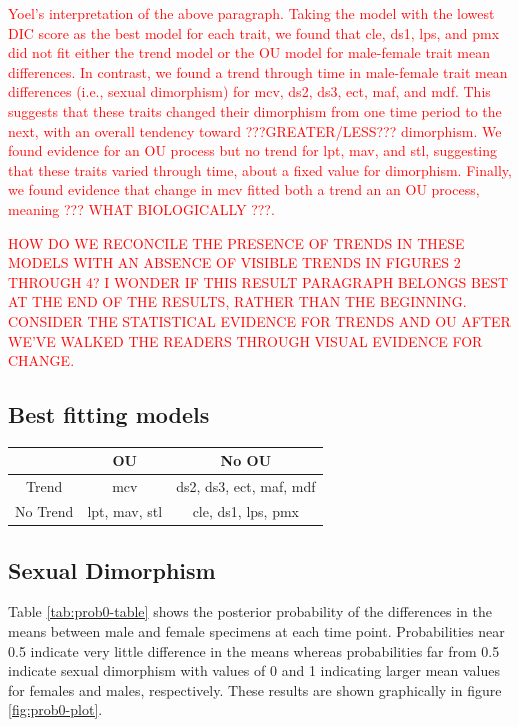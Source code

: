 \documentclass[
  12pt,
]{article}
\begin{document}
\textcolor{red} {
Yoel's interpretation of the above paragraph. Taking the model with the lowest DIC score as the best model for each trait, we found that cle, ds1, lps, and pmx did not fit either the trend model or the OU model for male-female trait mean differences. In contrast, we found a trend through time in male-female trait mean differences (i.e., sexual dimorphism) for mcv, ds2, ds3, ect, maf, and mdf. This suggests that these traits changed their dimorphism from one time period to the next, with an overall tendency toward ???GREATER/LESS??? dimorphism.
} \textcolor{red} {
We found evidence for an OU process but no trend for lpt, mav, and stl, suggesting that these traits varied through time, about a fixed value for dimorphism. Finally, we found evidence that change in mcv fitted both a trend an an OU process, meaning ??? WHAT BIOLOGICALLY ???.
}

\textcolor{red} {HOW DO WE RECONCILE THE PRESENCE OF TRENDS IN THESE MODELS WITH AN ABSENCE OF VISIBLE TRENDS IN FIGURES 2 THROUGH 4? I WONDER IF THIS RESULT PARAGRAPH BELONGS BEST AT THE END OF THE RESULTS, RATHER THAN THE BEGINNING. CONSIDER THE STATISTICAL EVIDENCE FOR TRENDS AND OU AFTER WE'VE WALKED THE READERS THROUGH VISUAL EVIDENCE FOR CHANGE.
}

\hypertarget{best-fitting-models}{%
\subsection{Best fitting models}\label{best-fitting-models}}

\begin{table}[ht]
\centering
\begin{tabular}{|c||c|c|}
  \hline
 & OU & No OU  \\ 
  \hline
  \hline
Trend  &  mcv  & ds2, ds3, ect, maf, mdf \\ 
  \hline
  No Trend & lpt, mav, stl  &  cle, ds1, lps, pmx\\
   \hline
\end{tabular}
\label{whichmodel}
\end{table}

\hypertarget{sexual-dimorphism}{%
\subsection{Sexual Dimorphism}\label{sexual-dimorphism}}

Table \ref{tab:prob0-table} shows the posterior probability of the
differences in the means between male and female specimens at each time
point. Probabilities near 0.5 indicate very little difference in the
means whereas probabilities far from 0.5 indicate sexual dimorphism with
values of 0 and 1 indicating larger mean values for females and males,
respectively. These results are shown graphically in figure
\ref{fig:prob0-plot}.
\end{document}
